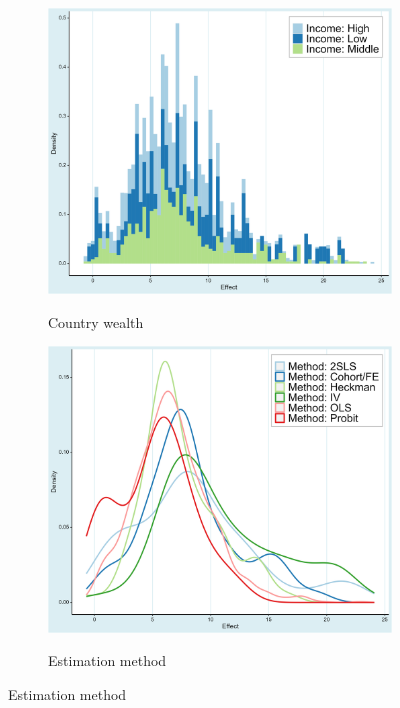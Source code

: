 \begin{figure}[!htbp]
\begin{center}
\begin{subfigure}[!htbp]{0.38\textwidth}
   \vspace{0.2cm}
   \caption{Country wealth}
   \vspace{-0.1cm}
   \includegraphics[width=0.95\linewidth]{Figures/Prima Facie/prima_facie_income.png}
   \label{fig:prima_facie_income}
\end{subfigure}
\begin{subfigure}[!htbp]{0.38\textwidth}
   \vspace{0.2cm}
   \caption{Estimation method}
   \vspace{-0.1cm}
   \includegraphics[width=0.95\linewidth]{Figures/Prima Facie/prima_facie_method.png}
   \label{fig:prima_facie_method} 
\end{subfigure}


\end{center}
\end{figure}
